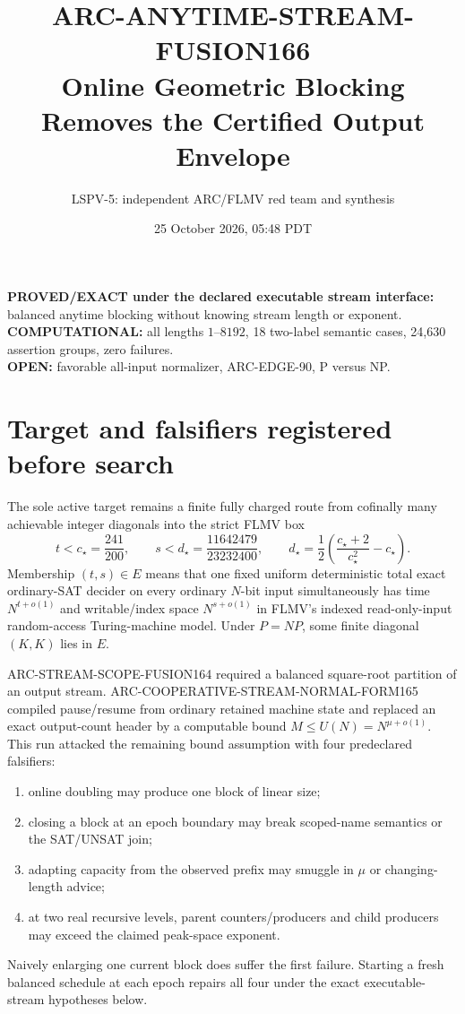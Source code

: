 \documentclass[11pt]{article}
\title{ARC-ANYTIME-STREAM-FUSION166\\
\large Online Geometric Blocking Removes the Certified Output Envelope}
\author{LSPV-5: independent ARC/FLMV red team and synthesis}
\date{25 October 2026, 05:48 PDT}
\begin{document}
\maketitle
\begin{center}
\textbf{PROVED/EXACT under the declared executable stream interface:}
balanced anytime blocking without knowing stream length or exponent.\\
\textbf{COMPUTATIONAL:} all lengths $1$--$8192$, 18 two-label semantic cases,
24,630 assertion groups, zero failures.\\
\textbf{OPEN:} favorable all-input normalizer, ARC-EDGE-90, P versus NP.
\end{center}

\section{Target and falsifiers registered before search}
The sole active target remains a finite fully charged route from cofinally many
achievable integer diagonals into the strict FLMV box
\[
t<c_\star=\frac{241}{200},\qquad
s<d_\star=\frac{11642479}{23232400},\qquad
d_\star=\frac12\left(\frac{c_\star+2}{c_\star^2}-c_\star\right).
\]
Membership $(t,s)\in E$ means that one fixed uniform deterministic total exact
ordinary-SAT decider on every ordinary $N$-bit input simultaneously has time
$N^{t+o(1)}$ and writable/index space $N^{s+o(1)}$ in FLMV's indexed
read-only-input random-access Turing-machine model.  Under $P=NP$, some finite
diagonal $(K,K)$ lies in $E$.

ARC-STREAM-SCOPE-FUSION164 required a balanced square-root partition of an
output stream.  ARC-COOPERATIVE-STREAM-NORMAL-FORM165 compiled pause/resume
from ordinary retained machine state and replaced an exact output-count header
by a computable bound $M\le U(N)=N^{\mu+o(1)}$.  This run attacked the remaining
bound assumption with four predeclared falsifiers:
\begin{enumerate}
\item online doubling may produce one block of linear size;
\item closing a block at an epoch boundary may break scoped-name semantics or
the SAT/UNSAT join;
\item adapting capacity from the observed prefix may smuggle in $\mu$ or
changing-length advice;
\item at two real recursive levels, parent counters/producers and child
producers may exceed the claimed peak-space exponent.
\end{enumerate}
Naively enlarging one current block does suffer the first failure.  Starting a
fresh balanced schedule at each epoch repairs all four under the exact
executable-stream hypotheses below.
\end{document}
